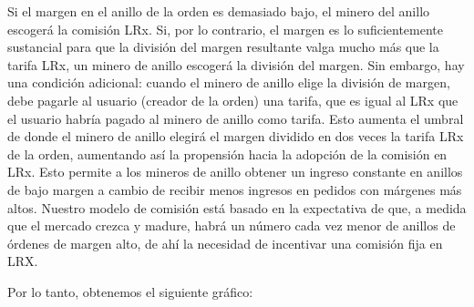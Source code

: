 \documentclass[UTF8,nofonts]{article}
\makeatletter
\newenvironment{figurehere}
 {\def\@captype{figure}}
 {}
\makeatother
\begin{document}
\begin{multicols}{2}
\begin{center}
\begin{figurehere}
\caption{Un 60\% de Margen Dividido}
\label{fig:marginsplit}
\end{figurehere}
\end{center}
Si el margen en el anillo de la orden es demasiado bajo, el minero del anillo escoger\'a la comisi\'on LRx. Si, por lo contrario, el margen es lo suficientemente sustancial para que la divisi\'on del margen resultante valga mucho m\'as que la tarifa LRx, un minero de anillo escoger\'a la divisi\'on del margen. Sin embargo, hay una condici\'on adicional: cuando el minero de anillo elige la divisi\'on de margen, debe pagarle al usuario (creador de la orden) una tarifa, que es igual al LRx que el usuario habr\'ia pagado al minero de anillo como tarifa. Esto aumenta el umbral de donde el minero de anillo elegir\'a el margen dividido en dos veces la tarifa LRx de la orden, aumentando as\'i la propensi\'on hacia la adopci\'on de la comisi\'on en LRx.  Esto permite a los mineros de anillo obtener un ingreso constante en anillos de bajo margen a cambio de recibir menos ingresos en pedidos con m\'argenes m\'as altos. Nuestro modelo de comisi\'on est\'a basado en la expectativa de que, a medida que el mercado crezca y madure, habr\'a un n\'umero cada vez menor de anillos de \'ordenes de margen alto, de ah\'i la necesidad de incentivar una comisi\'on fija en LRX. 

Por lo tanto, obtenemos el siguiente gr\'afico:

\begin{center}
\begin{figurehere}
\centering
{}
\caption{Loopring's Fee Model}
\label{fig:feemodel}
\end{figurehere}
\end{center}


\end{multicols}
\end{document}
